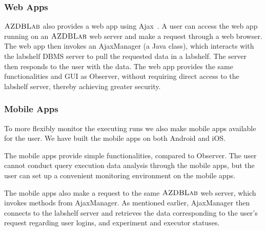 \documentclass{vldb}
\def\azdb{\hbox{\sc AZDBLab}}
\begin{document}
\subsubsection{Web Apps}
$\azdb$ also provides a web app using Ajax~\cite{ajax}. 
A user can access the web app running on an $\azdb$ web server 
and make a request through a web browser. 
The web app then invokes an \hbox{AjaxManager} (a Java class), 
which interacts with the \hbox{labshelf} DBMS server to pull the requested data in a labshelf.
The server then responds to the user with the data.
The web app \hbox{provides} the same functionalities and GUI as \hbox{Observer}, 
without requiring direct access to the labshelf server, thereby achieving greater security.

\subsubsection{Mobile Apps}
To more flexibly monitor the executing runs we also make mobile apps available for the user.
We have built the mobile apps on both \hbox{Android} and \hbox{iOS}. 

The mobile apps provide simple functionalities, compared to \hbox{Observer}. 
The user cannot conduct query execution data \hbox{analysis} through the mobile apps, 
but the user can set up a convenient \hbox{monitoring} environment on the mobile apps.


The mobile apps also make a request to the same \linebreak 
$\azdb$ web server, 
which invokes methods from \linebreak \hbox{AjaxManager}. 
As mentioned earlier, \hbox{AjaxManager} then connects to the labshelf server and 
retrieves the data \linebreak \hbox{corresponding} to the user's request regarding 
user \hbox{logins}, and \hbox{experiment} and \hbox{executor} \hbox{statuses}. 
\end{document}
